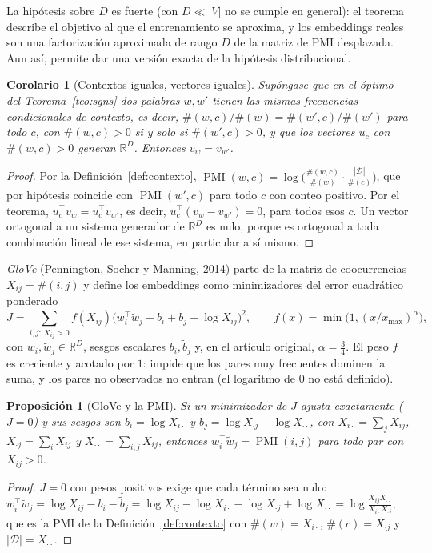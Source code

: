 \documentclass[11pt]{article}
\newtheorem{proposicion}[teorema]{Proposición}
\newtheorem{corolario}[teorema]{Corolario}
\theoremstyle{definition}
\theoremstyle{remark}
\newcommand{\R}{\mathbb{R}}
\DeclareMathOperator{\PMI}{PMI}
\newcommand{\abs}[1]{\left\lvert #1\right\rvert}
\begin{document}
\noindent La hipótesis sobre $D$ es fuerte (con $D\ll\abs V$ no se cumple en general): el teorema describe el objetivo al que el entrenamiento se aproxima, y los embeddings reales son una factorización aproximada de rango $D$ de la matriz de PMI desplazada. Aun así, permite dar una versión exacta de la hipótesis distribucional.

\begin{corolario}[Contextos iguales, vectores iguales]\label{cor:contextos}
\noindent Supóngase que en el óptimo del Teorema~\ref{teo:sgns} dos palabras $w,w'$ tienen las mismas frecuencias condicionales de contexto, es decir, $\#(w,c)/\#(w)=\#(w',c)/\#(w')$ para todo $c$, con $\#(w,c)>0$ si y solo si $\#(w',c)>0$, y que los vectores $u_c$ con $\#(w,c)>0$ generan $\R^D$. Entonces $v_w=v_{w'}$.
\end{corolario}
\begin{proof}
\noindent Por la Definición~\ref{def:contexto}, $\PMI(w,c)=\log\big(\frac{\#(w,c)}{\#(w)}\cdot\frac{\abs{\mathcal D}}{\#(c)}\big)$, que por hipótesis coincide con $\PMI(w',c)$ para todo $c$ con conteo positivo. Por el teorema, $u_c^\top v_w=u_c^\top v_{w'}$, es decir, $u_c^\top(v_w-v_{w'})=0$, para todos esos $c$. Un vector ortogonal a un sistema generador de $\R^D$ es nulo, porque es ortogonal a toda combinación lineal de ese sistema, en particular a sí mismo.
\end{proof}

\noindent \emph{GloVe} (Pennington, Socher y Manning, 2014) parte de la matriz de coocurrencias $X_{ij}=\#(i,j)$ y define los embeddings como minimizadores del error cuadrático ponderado
\[
J=\sum_{i,j:\,X_{ij}>0}f(X_{ij})\big(w_i^\top\tilde w_j+b_i+\tilde b_j-\log X_{ij}\big)^2,\qquad f(x)=\min\big(1,(x/x_{\max})^{\alpha}\big),
\]
con $w_i,\tilde w_j\in\R^D$, sesgos escalares $b_i,\tilde b_j$ y, en el artículo original, $\alpha=\frac34$. El peso $f$ es creciente y acotado por $1$: impide que los pares muy frecuentes dominen la suma, y los pares no observados no entran (el logaritmo de $0$ no está definido).

\begin{proposicion}[GloVe y la PMI]\label{prop:glove}
\noindent Si un minimizador de $J$ ajusta exactamente ($J=0$) y sus sesgos son $b_i=\log X_{i\cdot}$ y $\tilde b_j=\log X_{\cdot j}-\log X_{\cdot\cdot}$, con $X_{i\cdot}=\sum_jX_{ij}$, $X_{\cdot j}=\sum_iX_{ij}$ y $X_{\cdot\cdot}=\sum_{i,j}X_{ij}$, entonces $w_i^\top\tilde w_j=\PMI(i,j)$ para todo par con $X_{ij}>0$.
\end{proposicion}
\begin{proof}
\noindent $J=0$ con pesos positivos exige que cada término sea nulo: $w_i^\top\tilde w_j=\log X_{ij}-b_i-\tilde b_j=\log X_{ij}-\log X_{i\cdot}-\log X_{\cdot j}+\log X_{\cdot\cdot}=\log\frac{X_{ij}X_{\cdot\cdot}}{X_{i\cdot}X_{\cdot j}}$, que es la PMI de la Definición~\ref{def:contexto} con $\#(w)=X_{i\cdot}$, $\#(c)=X_{\cdot j}$ y $\abs{\mathcal D}=X_{\cdot\cdot}$.
\end{proof}
\end{document}
